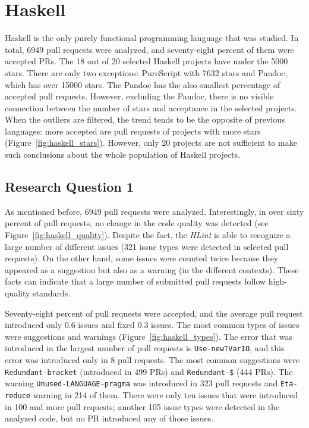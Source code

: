 \documentclass[digital,oneside,oldtable,nolof,nolot,nocover]{fithesis4}
\begin{document}
\section{Haskell}
\label{sec:orga65dd3b}
Haskell is the only purely functional programming language that was studied.
In total, 6949 pull requests were analyzed, and seventy-eight percent of them were accepted PRs.
The 18 out of 20 selected Haskell projects have under the 5000 stars. There
are only two exceptions: PureScript with 7632 stars and Pandoc, which has over
15000 stars. The Pandoc has the also smallest percentage of accepted pull
requests.  However, excluding the Pandoc, there is no visible connection
between the number of stars and acceptance in the selected projects. When the
outliers are filtered, the trend tends to be the opposite of previous languages:
more accepted are pull requests of projects with more stars (Figure~\ref{fig:haskell_stars}).
However, only 20 projects are not sufficient to make such conclusions about the whole
population of Haskell projects.
\subsection{Research Question 1}
\label{sec:org78b8270}
As mentioned before, 6949 pull requests were analyzed. Interestingly, in over sixty
percent of pull requests, no change in the code quality was detected (see Figure~\ref{fig:haskell_quality}).
Despite the fact, the \emph{HLint} is able to recognize a large number of different issues (321 issue
types were detected in selected pull requests). On the other hand, some issues
were counted twice because they appeared as a suggestion but also as a warning (in the different contexts).
These facts can indicate that a large
number of submitted pull requests follow high-quality standards.

Seventy-eight percent of pull requests were accepted, and the average pull request introduced
only 0.6 issues and fixed 0.3 issues. The most common types of issues were suggestions
and warnings (Figure~\ref{fig:haskell_types}). The error that was
introduced in the largest number of pull requests is
\texttt{Use-newTVarIO}, and this error was introduced only in 8 pull requests. The most common
suggestions were \texttt{Redundant-bracket} (introduced in 499 PRs) and \texttt{Redundant-\$} (444 PRs).
The warning \texttt{Unused-LANGUAGE-pragma} was introduced in 323 pull requests and \texttt{Eta-reduce}
warning in 214 of them. There were only ten issues that were introduced in 100 and more
pull requests; another 105 issue types were detected in the analyzed code, but no PR introduced
any of those issues.
\end{document}
